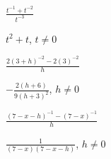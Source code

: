 \documentclass{ximera}
\begin{document}
\begin{question}
\begin{problem}
\end{problem}

\begin{problem}
$\frac{t^{-1} + t^{-2}}{t^{-3}}$

\begin{solution}
$t^2+t$, $t \neq 0$
\end{solution}
\end{problem}

\begin{problem}
$\frac{2(3+h)^{-2} - 2(3)^{-2}}{h}$

\begin{solution}
 $-\frac{2(h+6)}{9(h+3)^2}$, $h \neq 0$ 
\end{solution}
\end{problem}

\begin{problem} \label{ratsimplast}
$\frac{(7-x-h)^{-1} - (7-x)^{-1}}{h}$ 

\begin{solution}
 $\frac{1}{(7-x)(7-x-h)}$, $h \neq 0$ 
\end{solution}
\end{problem}

\end{question}
\end{document}
